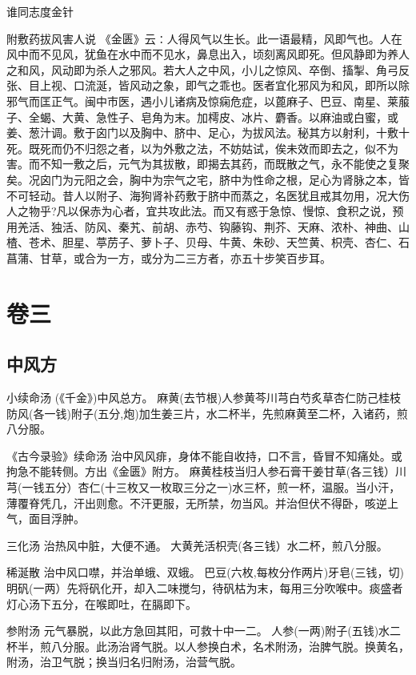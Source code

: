 \documentclass[a4paper,12pt,UTF8,twoside]{ctexbook}
\begin{document}
    谁同志度金针
    
    
    附敷药拔风害人说	
    《金匮》云∶人得风气以生长。此一语最精，风即气也。人在风中而不见风，犹鱼在水中而不见水，鼻息出入，顷刻离风即死。但风静即为养人之和风，风动即为杀人之邪风。若大人之中风，小儿之惊风、卒倒、搐掣、角弓反张、目上视、口流涎，皆风动之象，即气之乖也。医者宜化邪风为和风，即所以除邪气而匡正气。闽中市医，遇小儿诸病及惊痫危症，以蓖麻子、巴豆、南星、莱菔子、全蝎、大黄、急性子、皂角为末。加樗皮、冰片、麝香。以麻油或白蜜，或姜、葱汁调。敷于囟门以及胸中、脐中、足心，为拔风法。秘其方以射利，十敷十死。既死而仍不归怨之者，以为外敷之法，不妨姑试，俟未效而即去之，似不为害。而不知一敷之后，元气为其拔散，即揭去其药，而既散之气，永不能使之复聚矣。况囟门为元阳之会，胸中为宗气之宅，脐中为性命之根，足心为肾脉之本，皆不可轻动。昔人以附子、海狗肾补药敷于脐中而蒸之，名医犹且戒其勿用，况大伤人之物乎?凡以保赤为心者，宜共攻此法。而又有惑于急惊、慢惊、食积之说，预用羌活、独活、防风、秦艽、前胡、赤芍、钩藤钩、荆芥、天麻、浓朴、神曲、山楂、苍术、胆星、葶苈子、萝卜子、贝母、牛黄、朱砂、天竺黄、枳壳、杏仁、石菖蒲、甘草，或合为一方，或分为二三方者，亦五十步笑百步耳。
    
    
    
    \part{卷三}
    \chapter{中风方}
    	
    
    小续命汤
    (《千金》)中风总方。
    麻黄(去节根)人参黄芩川芎白芍炙草杏仁防己桂枝防风(各一钱)附子(五分,炮)加生姜三片，水二杯半，先煎麻黄至二杯，入诸药，煎八分服。
    
    《古今录验》续命汤
    治中风风痱，身体不能自收持，口不言，昏冒不知痛处。或拘急不能转侧。方出《金匮》附方。
    麻黄桂枝当归人参石膏干姜甘草(各三钱）川芎(一钱五分）杏仁(十三枚又一枚取三分之一)水三杯，煎一杯，温服。当小汗，薄覆脊凭几，汗出则愈。不汗更服，无所禁，勿当风。并治但伏不得卧，咳逆上气，面目浮肿。
    
    三化汤
    治热风中脏，大便不通。
    大黄羌活枳壳(各三钱）水二杯，煎八分服。
    
    稀涎散
    治中风口噤，并治单蛾、双蛾。
    巴豆(六枚,每枚分作两片)牙皂(三钱，切)明矾(一两）先将矾化开，却入二味搅匀，待矾枯为末，每用三分吹喉中。痰盛者灯心汤下五分，在喉即吐，在膈即下。
    
    参附汤
    元气暴脱，以此方急回其阳，可救十中一二。
    人参(一两)附子(五钱)水二杯半，煎八分服。此汤治肾气脱。以人参换白术，名术附汤，治脾气脱。换黄名，附汤，治卫气脱；换当归名归附汤，治营气脱。
    
\end{document}
